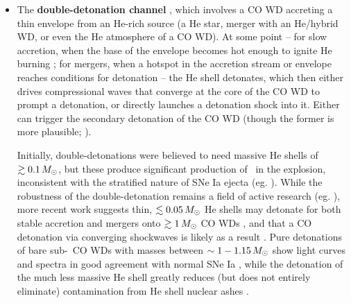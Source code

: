 \begin{itemize}


	\item The {\bf double-detonation channel} \citep{livn90, woosw94}, which involves a CO WD accreting a thin envelope from an He-rich source (a He star, merger with an He/hybrid WD, or even the He atmosphere of a CO WD).  At some point -- for slow accretion, when the base of the envelope becomes hot enough to ignite He burning  \citep{woosk11}; for mergers, when a hotspot in the accretion stream or envelope reaches conditions for detonation \citep{guil+10, rask+12, pakm+13} -- the He shell detonates, which then either drives compressional waves that converge at the core of the CO WD to prompt a detonation, or directly launches a detonation shock into it.  Either can trigger the secondary detonation of the CO WD (though the former is more plausible; \citealt{mollw13}).  

Initially, double-detonations were believed to need massive He shells of $\gtrsim0.1\,\Msun$, but these produce significant production of \Ni\ in the explosion, inconsistent with the stratified nature of SNe Ia ejecta (eg. \citealt{krom+10,woosk11}).  While the robustness of the double-detonation remains a field of active research (eg. \citealt{woosk11, holc+13, shenm14, shenb14, dan+15}), more recent work suggests thin, $\lesssim0.05\,\Msun$ He shells may detonate for both stable accretion and mergers onto $\gtrsim1\,\Msun$ CO WDs \citep{woosk11, pakm+13, shenm14}, and that a CO detonation via converging shockwaves is likely as a result \citep{fink+10, mollw13, shenb14}.  Pure detonations of bare sub-\Mch\ CO WDs with masses between $\sim1-1.15\,\Msun$ show light curves and spectra in good agreement with normal SNe Ia \citep{shig+92, sim+10}, while the detonation of the much less massive He shell greatly reduces (but does not entirely eliminate) contamination from He shell nuclear ashes \citep{krom+10, hill+13}.



\end{itemize}
